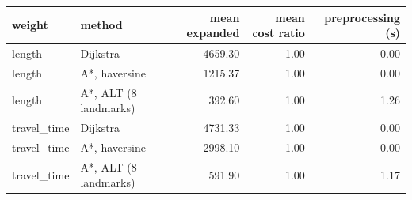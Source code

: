 \begin{tabular}{llrrr}
\toprule
weight & method & mean expanded & mean cost ratio & preprocessing (s) \\
\midrule
length & Dijkstra & 4659.30 & 1.00 & 0.00 \\
length & A*, haversine & 1215.37 & 1.00 & 0.00 \\
length & A*, ALT (8 landmarks) & 392.60 & 1.00 & 1.26 \\
travel\_time & Dijkstra & 4731.33 & 1.00 & 0.00 \\
travel\_time & A*, haversine & 2998.10 & 1.00 & 0.00 \\
travel\_time & A*, ALT (8 landmarks) & 591.90 & 1.00 & 1.17 \\
\bottomrule
\end{tabular}
